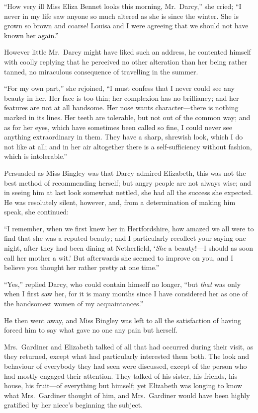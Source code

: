 \documentclass[12pt,english,oneside]{book}
\begin{document}
{}``How very ill Miss Eliza Bennet looks this morning, Mr.\ Darcy,''
she cried; {}``I never in my life saw anyone so much altered as she
is since the winter. She is grown so brown and coarse! Louisa and
I were agreeing that we should not have known her again.''

However little Mr.\ Darcy might have liked such an address, he contented
himself with coolly replying that he perceived no other alteration
than her being rather tanned, no miraculous consequence of travelling
in the summer.

{}``For my own part,'' she rejoined, {}``I must confess that I
never could see any beauty in her. Her face is too thin; her complexion
has no brilliancy; and her features are not at all handsome. Her nose
wants character\mbox{---}there is nothing marked in its lines. Her
teeth are tolerable, but not out of the common way; and as for her
eyes, which have sometimes been called so fine, I could never see
anything extraordinary in them. They have a sharp, shrewish look,
which I do not like at all; and in her air altogether there is a self-sufficiency
without fashion, which is intolerable.''

Persuaded as Miss Bingley was that Darcy admired Elizabeth, this was
not the best method of recommending herself; but angry people are
not always wise; and in seeing him at last look somewhat nettled,
she had all the success she expected. He was resolutely silent, however,
and, from a determination of making him speak, she continued:

{}``I remember, when we first knew her in Hertfordshire, how amazed
we all were to find that she was a reputed beauty; and I particularly
recollect your saying one night, after they had been dining at Netherfield,
`\textit{She} a beauty!\mbox{---}I should as soon call her mother
a wit.' But afterwards she seemed to improve on you, and I believe
you thought her rather pretty at one time.''

{}``Yes,'' replied Darcy, who could contain himself no longer, {}``but
\textit{that} was only when I first saw her, for it is many months
since I have considered her as one of the handsomest women of my acquaintances.''

He then went away, and Miss Bingley was left to all the satisfaction
of having forced him to say what gave no one any pain but herself.

Mrs.\ Gardiner and Elizabeth talked of all that had occurred during
their visit, as they returned, except what had particularly interested
them both. The look and behaviour of everybody they had seen were
discussed, except of the person who had mostly engaged their attention.
They talked of his sister, his friends, his house, his fruit\mbox{---}of
everything but himself; yet Elizabeth was longing to know what Mrs.\ Gardiner
thought of him, and Mrs.\ Gardiner would have been highly gratified
by her niece's beginning the subject.
\end{document}
